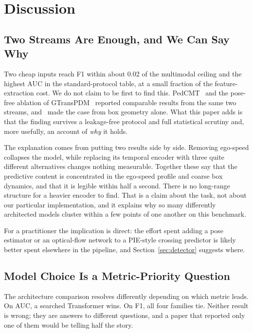 \documentclass[mti,article,submit,moreauthors]{Definitions/mdpi}
\begin{document}
\section{Discussion}
\label{sec:discussion}

\subsection{Two Streams Are Enough, and We Can Say Why}

Two cheap inputs reach F1 within about 0.02 of the multimodal ceiling and the highest AUC in the standard-protocol table, at a small fraction of the feature-extraction cost. We do not claim to be first to find this. PedCMT~\citep{chen2024pedcmt} and the pose-free ablation of GTransPDM~\citep{xie2025gtranspdm} reported comparable results from the same two streams, and~\citet{achaji2022attention} made the case from box geometry alone. What this paper adds is that the finding survives a leakage-free protocol and full statistical scrutiny and, more usefully, an account of \emph{why} it holds.

The explanation comes from putting two results side by side. Removing ego-speed collapses the model, while replacing its temporal encoder with three quite different alternatives changes nothing measurable. Together these say that the predictive content is concentrated in the ego-speed profile and coarse box dynamics, and that it is legible within half a second. There is no long-range structure for a heavier encoder to find. That is a claim about the task, not about our particular implementation, and it explains why so many differently architected models cluster within a few points of one another on this benchmark.

For a practitioner the implication is direct: the effort spent adding a pose estimator or an optical-flow network to a PIE-style crossing predictor is likely better spent elsewhere in the pipeline, and Section~\ref{sec:detector} suggests where.

\subsection{Model Choice Is a Metric-Priority Question}

The architecture comparison resolves differently depending on which metric leads. On AUC, a searched Transformer wins. On F1, all four families tie. Neither result is wrong; they are answers to different questions, and a paper that reported only one of them would be telling half the story.
\end{document}
